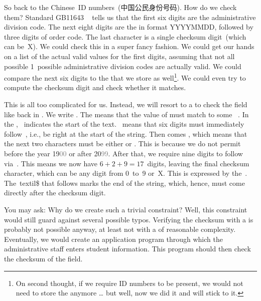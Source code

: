 So back to the Chinese~ID numbers~(中国公民身份号码).
How do we check them?
Standard \mbox{GB11643} ~\cite{GB116431999CIN} tells us that the first six digits are the administrative division code.
The next eight digits are the  in format YYYYMMDD, followed by three digits of order code.
The last character is a single checksum digit~(which can be~X).
We could check this in a super fancy fashion.
We could get our hands on a list of the actual valid values for the first digits, assuming that not all possible 1~possible administrative division codes are actually valid.
We could compare the next six digits to the  that we store as well\footnote{%
On second thought, if we require ID numbers to be present, we would not need to store the  anymore {\dots} but well, now we did it and will stick to it.}.
We could even try to compute the checksum digit and check whether it matches.%
%
\begin{sloppypar}%
This is all too complicated for us.
Instead, we will resort to a  to check the field like back in .
We write \expandafter{}.
The  means that the value of  must match to some ~.
In the , \textil{^}~indicates the start of the text.
~means that six digits must immediately follow~\textil{^}, i.e., be right at the start of the string.
Then comes , which means that the next two characters must be either  or .
This is because we do not permit  before the year 19\textcolor{gray}{00} or after 20\textcolor{gray}{99}.
After that, we require nine digits to follow via~.
This means we now have $6+2+9=17$~digits, leaving the final checksum character, which can be any digit from 0~to~9 or~X.
This is expressed by the~\textil{[0-9X]}.
The~textil{\$} that follows marks the end of the string, which, hence, must come directly after the checksum digit.%
\end{sloppypar}%
%
You may ask:
Why do we create such a trivial constraint?
Well, this constraint would still guard against several possible typos.
Verifying the checksum with a  is probably not possible anyway, at least not with a  of reasonable complexity.
Eventually, we would create an application program through which the administrative staff enters student information.
This program should then check the checksum of the  field.

